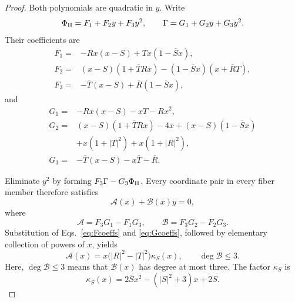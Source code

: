 \begin{proof}
Both polynomials are quadratic in $y$.  Write
\begin{equation}
\Phi_{\rm H}=F_1+F_2y+F_3y^2,
\qquad
\Gamma=G_1+G_2y+G_3y^2.
\label{eq:FGcoeffdefinition}
\end{equation}
Their coefficients are
\begin{equation}
\begin{aligned}
F_1={}&-Rx(x-S)+Tx(1-\overline Sx),\\
F_2={}&(x-S)(1+\overline T Rx)
       -(1-\overline Sx)(x+\overline RT),\\
F_3={}&-\overline T(x-S)+\overline R(1-\overline Sx),
\end{aligned}
\label{eq:Fcoeffs}
\end{equation}
and
\begin{equation}
\begin{aligned}
G_1={}&-Rx(x-S)-xT-Rx^2,\\
G_2={}&(x-S)(1+\overline T Rx)-4x
 +(x-S)(1-\overline Sx)\\
&+x(1+|T|^2)+x(1+|R|^2),\\
G_3={}&-\overline T(x-S)-x\overline T-\overline R.
\end{aligned}
\label{eq:Gcoeffs}
\end{equation}

Eliminate $y^2$ by forming $F_3\Gamma-G_3\Phi_{\rm H}$.  Every coordinate pair in every fiber member therefore satisfies
\begin{equation}
\mathcal A(x)+\mathcal B(x)y=0,
\label{eq:linearEliminant}
\end{equation}
where
\begin{equation}
\mathcal A=F_3G_1-F_1G_3,
\qquad
\mathcal B=F_3G_2-F_2G_3.
\label{eq:ABeliminants}
\end{equation}
Substitution of Eqs.~\eqref{eq:Fcoeffs} and \eqref{eq:Gcoeffs}, followed by elementary collection of powers of $x$, yields
\begin{equation}
\mathcal A(x)=x\bigl(|R|^2-|T|^2\bigr)\kappa_S(x),
\qquad \deg\mathcal B\leq3.
\label{eq:Afactor}
\end{equation}
Here, $\deg\mathcal B\leq3$ means that $\mathcal B(x)$ has degree at most three. The factor $\kappa_S$ is
\begin{equation}
\kappa_S(x)=2\overline Sx^2-(|S|^2+3)x+2S.
\label{eq:kappaS}
\end{equation}


\end{proof}
